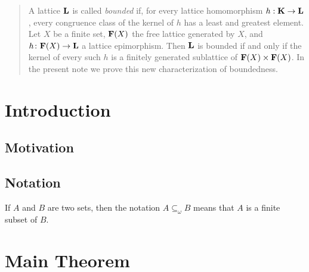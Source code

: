 \author[P.~Mayr]{Peter Mayr}

\author[N.~Ru\v{s}kuc]{Nik Ru\v{s}kuc}


\date{\today}


\begin{abstract}
A lattice $\mathbf{L}$ is 
called \emph{bounded} if, for every lattice 
homomorphism $h : \mathbf{K} \to \mathbf{L}$, every congruence class of the 
kernel of $h$ has a least and greatest element.  
Let $X$ be a finite set, $\mathbf{F} (X)$ the free lattice 
generated by $X$, and $h \colon \mathbf{F}(X) \to \mathbf{L}$ a lattice 
epimorphism.
Then $\mathbf{L}$ is bounded if and only if the 
kernel of every such $h$ is a finitely generated sublattice of 
$\mathbf{F}(X) \times \mathbf{F}(X)$. 
In the present note we prove this new characterization of boundedness.  
\end{abstract}

\maketitle
\section{Introduction}

\subsection{Motivation}

\subsection{Notation}
\newcommand\finsub{\ensuremath{\subseteq_{\omega}}}
If $A$ and $B$ are two sets, then the notation $A \finsub B$ means 
that $A$ is a finite subset of $B$.

\section{Main Theorem}

